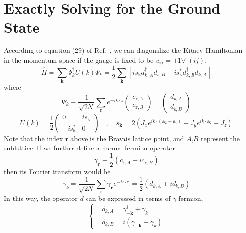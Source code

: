 \documentclass[12font]{article}
\numberwithin{equation}{section}    %
\theoremstyle{definition}
\newcommand{\lr}[1]{\left(  #1  \right)}
\newcommand{\lrm}[1]{\left[  #1  \right]}
\newcommand{\bo}[1]{\mathbf{#1}}
\begin{document}
\section{Exactly Solving for the Ground State}
According to equation (29) of Ref.~\cite{Kitaev_2006}, we can diagonalize the Kitaev Hamiltonian in the momentum space if the gauge is fixed to be $u_{ij} = +1\forall\; (ij)$, 
\[\hat{H} = \sum_{\bo{k}}\Psi^\dagger_{k}U(k)\Psi_{k} = \frac{1}{2}\sum_{\bo{k}}\lrm{is_{\bo{k}}d_{k,A}^\dagger d_{k,B} - is_{\bo{k}}^*d_{k,B}^\dagger d_{k,A}}\]
where
\[\Psi_k \equiv \frac{1}{\sqrt{2N}}\sum_{\bo{r}}e^{-ik\cdot \bo{r}}\begin{pmatrix}
                                                             c_{\bo{r},A} \\
                                                             c_{\bo{r},B}
                                                           \end{pmatrix} = \begin{pmatrix}
                                                                             d_{k,A} \\
                                                                             d_{k,B}
                                                                           \end{pmatrix}\]
\[U(k) = \frac{1}{2}\begin{pmatrix}
                      0 & is_{\bo{k}} \\
                      -is_{\bo{k}}^* & 0 
                    \end{pmatrix} \quad , \quad s_{\bo{k}} = 2\lr{J_xe^{ik\cdot \lr{\bo{a}_2 - \bo{a}_1}} + J_ye^{ik\cdot \bo{a}_2} + J_z}\]
Note that the index $\bo{r}$ above is the Bravais lattice point, and $A$,$B$ represent the sublattice. If we further define a normal fermion operator, 
\begin{equation}\label{gamm def.e}
  \gamma_{\bo{r}} \equiv \frac{1}{2}\lr{c_{{\bo{r}},A} + ic_{{\bo{r}},B}}
\end{equation}
 then its Fourier transform would be 
\[\gamma_{k} = \frac{1}{\sqrt{2N}}\sum_{{\bo{r}}}\gamma_{{\bo{r}}}e^{-ik\cdot \bo{r}} = \frac{1}{2}\lr{d_{k,A} + id_{k,B}}\]
In this way, the operator $d$ can be expressed in terms of $\gamma$ fermion,
\[
\left\{
\begin{aligned}
& d_{k,A} = \gamma_{-\bo{k}}^\dagger + \gamma_{k} \\
& d_{k,B} = i\lr{\gamma_{-\bo{k}}^\dagger - \gamma_{k}}
\end{aligned}
\right.
\]
\end{document}
